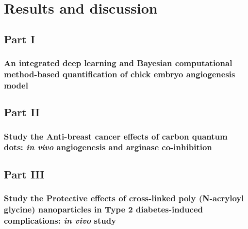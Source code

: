 \chapter{Results and discussion}

\section*{Part I}
\subsection*{An integrated deep learning and Bayesian computational method-based quantification of chick embryo angiogenesis model}
\section*{Part II}
\subsection*{Study the Anti-breast cancer effects of carbon quantum dots: \textit{in vivo} angiogenesis and arginase co-inhibition}
\section*{Part III}
\subsection*{Study the Protective effects of cross-linked poly (N-acryloyl glycine) nanoparticles in Type 2 diabetes-induced complications: \textit{in vivo} study}

\newpage